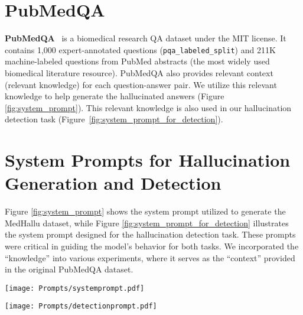 \section{PubMedQA}

\textbf{PubMedQA}~\cite{PubmedQA} is a biomedical research QA dataset under the MIT license. It contains 1,000 expert-annotated questions (\texttt{pqa\_labeled\_split}) and 211K machine-labeled questions from PubMed abstracts (the most widely used biomedical literature resource). PubMedQA also provides relevant context (relevant knowledge) for each question-answer pair. We utilize this relevant knowledge to help generate the hallucinated answers (Figure \ref{fig:system_prompt}). This relevant knowledge is also used in our hallucination detection task (Figure~\ref{fig:system_prompt_for_detection}).


\section{System Prompts for Hallucination Generation and Detection} \label{appendix:prompt}
Figure \ref{fig:system_prompt} shows the system prompt utilized to generate the MedHallu dataset, while Figure \ref{fig:system_prompt_for_detection} illustrates the system prompt designed for the hallucination detection task. These prompts were critical in guiding the model's behavior for both tasks. We incorporated the ``knowledge'' into various experiments, where it serves as the ``context'' provided in the original PubMedQA dataset.





\begin{figure*}[ht]
\centering
\small
\texttt{[image: Prompts/systemprompt.pdf]}
\caption{System prompt used to generate MedHallu dataset. The ``knowledge'' refers to the relevant context of a specific question pair. The PubMedQA dataset provides this ``knowledge''.}
\label{fig:system_prompt}
\end{figure*}


\begin{figure*}[ht]
\centering
\texttt{[image: Prompts/detectionprompt.pdf]}
\caption{System prompt used for the hallucination detection task. The ``knowledge'' refers to the relevant context of a specific question pair. The PubMedQA dataset provides this ``knowledge''.}
\label{fig:system_prompt_for_detection}
\end{figure*}

